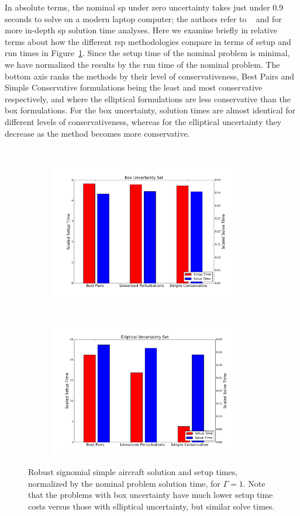 In absolute
terms, the nominal \gls{sp} under zero uncertainty
takes just under 0.9 seconds to solve on a modern laptop computer; the authors
refer to ~\cite{Kirschen2018Log} and \cite{York2018} for more in-depth \gls{sp} solution time analyses.
Here we examine briefly in relative terms about how the different \gls{rsp} methodologies compare in terms of setup and
run times in Figure~\ref{compare_signomial}. Since the setup time of the nominal problem is minimal,
we have normalized the results by the run time of the nominal problem.
The bottom axis ranks the methods by their level of conservativeness, Best Pairs
and Simple Conservative formulations being the least and most conservative respectively,
and where the elliptical formulations are less conservative than the box formulations.
For the box uncertainty, solution times are almost identical for different levels of conservativeness,
whereas for the elliptical uncertainty they decrease as the method becomes more conservative.

\ \\
\begin{figure}[ht]
    \centering
    \captionsetup{justification=centering, font=small}
    \begin{subfigure}{0.49\textwidth}
        \centering
        \includegraphics[height=2.3in]{signomial_simple_flight/box_sst.pdf}
    \end{subfigure}
    ~
    \begin{subfigure}{0.49\textwidth}
        \centering
        \includegraphics[height=2.3in]{signomial_simple_flight/ell_sst.pdf}
    \end{subfigure}
    \caption{Robust signomial simple aircraft solution and setup times, normalized by the
    nominal problem solution time, for $\Gamma = 1$.
    Note that the problems with box uncertainty have much lower setup
    time costs versus those with elliptical uncertainty, but similar solve times.}
    \label{compare_signomial}
\end{figure}

